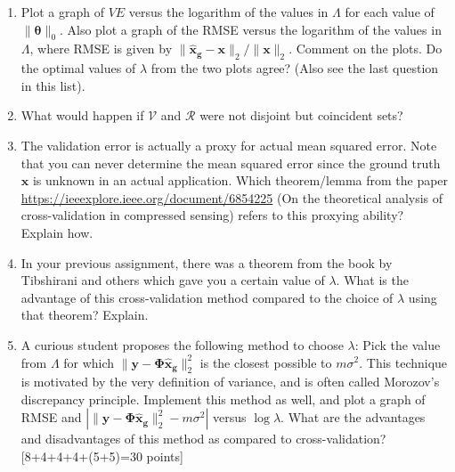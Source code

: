 \documentclass[11pt]{article}
\begin{document}
\begin{enumerate}
\begin{enumerate}
\item Plot a graph of $VE$ versus the logarithm of the values in $\Lambda$ for each value of $\|\boldsymbol{\theta}\|_0$.  Also plot a graph of the RMSE versus the logarithm of the values in $\Lambda$, where RMSE is given by $\|\boldsymbol{\hat{x}_g} - \boldsymbol{x}\|_2 / \|\boldsymbol{x}\|_2$. Comment on the plots. Do the optimal values of $\lambda$ from the two plots agree? (Also see the last question in this list).
\item What would happen if $\mathcal{V}$ and $\mathcal{R}$ were not disjoint but coincident sets? 
\item The validation error is actually a proxy for actual mean squared error. Note that you can never determine the mean squared error since the ground truth $\boldsymbol{x}$ is unknown in an actual application. Which theorem/lemma from the paper \url{https://ieeexplore.ieee.org/document/6854225} (On the theoretical analysis of cross-validation in compressed sensing) refers to this proxying ability? Explain how.  
\item In your previous assignment, there was a theorem from the book by Tibshirani and others which gave you a certain value of $\lambda$. What is the advantage of this cross-validation method compared to the choice of $\lambda$ using that theorem? Explain.
\item A curious student proposes the following method to choose $\lambda$: Pick the value from $\Lambda$ for which $\|\boldsymbol{y}-\boldsymbol{\Phi \hat{x}_g}\|^2_2$ is the closest possible to $m \sigma^2$. This technique is motivated by the very definition of variance, and is often called Morozov's discrepancy principle. Implement this method as well, and plot a graph of RMSE and $|\|\boldsymbol{y}-\boldsymbol{\Phi \hat{x}_g}\|^2_2-m\sigma^2|$ versus $\log \lambda$. What are the advantages and disadvantages of this method as compared to cross-validation? 
\textsf{[8+4+4+4+(5+5)=30 points]}
\end{enumerate}


\end{enumerate}
\end{document}

